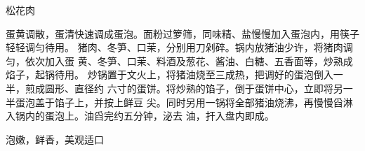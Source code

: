 \begin{recipe}{松花肉}

\ingredients


\preparation

\step 蛋黄调散，蛋清快速调成蛋泡。面粉过箩筛，同味精、盐慢慢加入蛋泡内，用筷子
轻轻调匀待用。
\step 猪肉、冬笋、口茉，分别用刀剁碎。锅内放猪油少许，将猪肉调匀，依次加入蛋
黄、冬笋、口茉、料酒及葱花、酱油、白糖、五香面等，炒熟成焰子，起锅待用。
\step 炒锅置于文火上，将猪油烧至三成热，把调好的蛋泡倒入一半，煎成圆形、直径约
六寸的蛋饼。将炒熟的馅子，倒于蛋饼中心，立即将另一半蛋泡盖于馅子上，并按上鲜豆
尖。同时另用一锅将全部猪油烧沸，再慢慢舀淋入锅内的蛋泡上。油舀完约五分钟，泌去
油，扞入盘内即成。

\features

泡嫩，鲜香，美观适口

\end{recipe}

